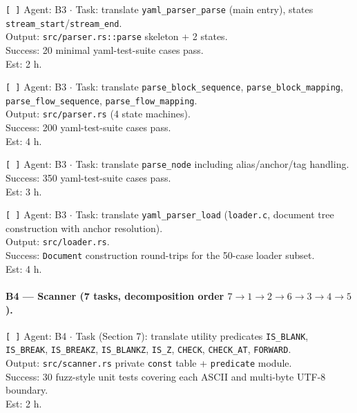 \documentclass[12pt]{article}
\theoremstyle{definition}
\theoremstyle{remark}
\begin{document}
\begin{flushleft}
\texttt{[\,]} Agent: B3 \(\cdot\) Task: translate
\texttt{yaml\_parser\_parse} (main entry), states
\texttt{stream\_start}/\texttt{stream\_end}.
\\
\quad Output: \texttt{src/parser.rs::parse} skeleton + 2 states.
\\
\quad Success: 20 minimal yaml-test-suite cases pass.
\\
\quad Est: 2 h.
\end{flushleft}

\begin{flushleft}
\texttt{[\,]} Agent: B3 \(\cdot\) Task: translate
\texttt{parse\_block\_sequence}, \texttt{parse\_block\_mapping},
\texttt{parse\_flow\_sequence}, \texttt{parse\_flow\_mapping}.
\\
\quad Output: \texttt{src/parser.rs} (4 state machines).
\\
\quad Success: 200 yaml-test-suite cases pass.
\\
\quad Est: 4 h.
\end{flushleft}

\begin{flushleft}
\texttt{[\,]} Agent: B3 \(\cdot\) Task: translate
\texttt{parse\_node} including alias/anchor/tag handling.
\\
\quad Success: 350 yaml-test-suite cases pass.
\\
\quad Est: 3 h.
\end{flushleft}

\begin{flushleft}
\texttt{[\,]} Agent: B3 \(\cdot\) Task: translate
\texttt{yaml\_parser\_load} (\texttt{loader.c}, document tree
construction with anchor resolution).
\\
\quad Output: \texttt{src/loader.rs}.
\\
\quad Success: \texttt{Document} construction round-trips for the
50-case loader subset.
\\
\quad Est: 4 h.
\end{flushleft}

\paragraph{B4 --- Scanner (7 tasks, decomposition order
$7{\to}1{\to}2{\to}6{\to}3{\to}4{\to}5$).}

\begin{flushleft}
\texttt{[\,]} Agent: B4 \(\cdot\) Task (Section 7): translate utility
predicates \texttt{IS\_BLANK}, \texttt{IS\_BREAK}, \texttt{IS\_BREAKZ},
\texttt{IS\_BLANKZ}, \texttt{IS\_Z}, \texttt{CHECK}, \texttt{CHECK\_AT},
\texttt{FORWARD}.
\\
\quad Output: \texttt{src/scanner.rs} private \texttt{const} table +
\texttt{predicate} module.
\\
\quad Success: 30 fuzz-style unit tests covering each ASCII and
multi-byte UTF-8 boundary.
\\
\quad Est: 2 h.
\end{flushleft}
\end{document}
